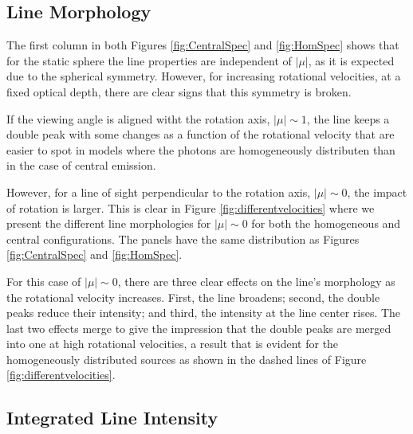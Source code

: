 \documentclass{emulateapj}
\newcommand{\ly}{{\ifmmode{{\rm Ly}\alpha~}\else{Ly$\alpha$~}\fi}}
\begin{document}
\subsection{Line Morphology}
\label{sec:angles}

The first column in both Figures \ref{fig:CentralSpec} and
\ref{fig:HomSpec} shows that for the static sphere the line properties
are independent of $|\mu|$, as it is expected due
to the spherical symmetry. However, for increasing rotational
velocities, at a fixed optical depth, there are clear signs that this
symmetry is broken. 

If the viewing angle is aligned witht the rotation axis, $|\mu|\sim
1$, the \ly line keeps a double peak with some changes as a function
of the rotational velocity that are easier to spot in models where the
\ly photons are homogeneously distributen than in the case of central
emission. 

However, for a line of sight perpendicular to the rotation
axis, $|\mu|\sim 0$, the impact of rotation is larger.  This is clear
in  Figure \ref{fig:differentvelocities} where we present the
different line morphologies for $|\mu|\sim 0$ for both the homogeneous
and central configurations. The panels have the same distribution as
Figures \ref{fig:CentralSpec} and \ref{fig:HomSpec}.  

For this case of $|\mu|\sim 0$, there are three clear effects on the
line's morphology as the rotational velocity increases. First, the
line broadens; second, the double peaks reduce their intensity; and
third, the intensity at the line center rises. The last two effects
merge to give the impression that the double peaks are merged into one
at high rotational velocities, a result that is evident for the
homogeneously distributed sources as shown in the dashed lines of
Figure \ref{fig:differentvelocities}. 


\subsection{Integrated Line Intensity}
\end{document}
